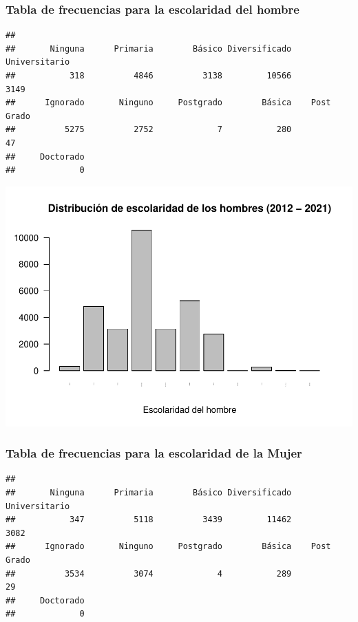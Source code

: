 \documentclass[
]{article}
\begin{document}
\hypertarget{tabla-de-frecuencias-para-la-escolaridad-del-hombre}{%
\subsubsection{Tabla de frecuencias para la escolaridad del
hombre}\label{tabla-de-frecuencias-para-la-escolaridad-del-hombre}}

\begin{verbatim}
## 
##       Ninguna      Primaria        Básico Diversificado Universitario 
##           318          4846          3138         10566          3149 
##      Ignorado       Ninguno     Postgrado        Básica    Post Grado 
##          5275          2752             7           280            47 
##     Doctorado 
##             0
\end{verbatim}

\includegraphics{Proyecto_files/figure-latex/frecuenciaEscolaridadHombre-1.pdf}

\hypertarget{tabla-de-frecuencias-para-la-escolaridad-de-la-mujer}{%
\subsubsection{Tabla de frecuencias para la escolaridad de la
Mujer}\label{tabla-de-frecuencias-para-la-escolaridad-de-la-mujer}}

\begin{verbatim}
## 
##       Ninguna      Primaria        Básico Diversificado Universitario 
##           347          5118          3439         11462          3082 
##      Ignorado       Ninguno     Postgrado        Básica    Post Grado 
##          3534          3074             4           289            29 
##     Doctorado 
##             0
\end{verbatim}
\end{document}
